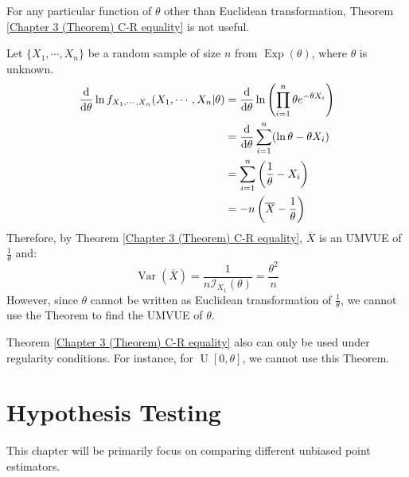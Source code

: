 \documentclass{huhtakm-template-book-v2}
\DeclareMathOperator{\Var}{Var}
\DeclareMathOperator{\Exp}{Exp}
\DeclareMathOperator{\U}{U}
\begin{document}
\begin{rem}
	For any particular function of $\theta$ other than Euclidean transformation, Theorem \ref{Chapter 3 (Theorem) C-R equality} is not useful.
\end{rem}
\begin{eg}
	Let $\{X_{1},\cdots,X_{n}\}$ be a random sample of size $n$ from $\Exp(\theta)$, where $\theta$ is unknown.
	\begin{align*}
		\odv*{\ln{f_{X_{1},\cdots,X_{n}}(X_{1},\cdots,X_{n}|\theta)}}{\theta}&=\odv*{\ln\left(\prod_{i=1}^{n}\theta e^{-\theta X_{i}}\right)}{\theta}\\
		&=\odv*{\sum_{i=1}^{n}(\ln{\theta}-\theta X_{i})}{\theta}\\
		&=\sum_{i=1}^{n}\left(\frac{1}{\theta}-X_{i}\right)\\
		&=-n\left(\overline{X}-\frac{1}{\theta}\right)
	\end{align*}
	Therefore, by Theorem \ref{Chapter 3 (Theorem) C-R equality}, $\overline{X}$ is an UMVUE of $\frac{1}{\theta}$ and:
	\begin{equation*}
		\Var(\overline{X})=\frac{1}{n\mathcal{I}_{X_{1}}(\theta)}=\frac{\theta^{2}}{n}
	\end{equation*}
	However, since $\theta$ cannot be written as Euclidean transformation of $\frac{1}{\theta}$, we cannot use the Theorem to find the UMVUE of $\theta$.
\end{eg}
\begin{rem}
	Theorem \ref{Chapter 3 (Theorem) C-R equality} also can only be used under regularity conditions. For instance, for $\U[0,\theta]$, we cannot use this Theorem.
\end{rem}

\chapter{Hypothesis Testing}
This chapter will be primarily focus on comparing different unbiased point estimators. 
\end{document}
